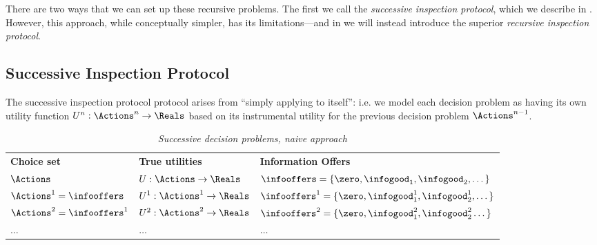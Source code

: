
There are two ways that we can set up these recursive problems. The first we call the \emph{successive inspection protocol}, which we describe in . However, this approach, while conceptually simpler, has its limitations---and in  we will instead introduce the superior \emph{recursive inspection protocol}.

\subsection{Successive Inspection Protocol}
\label{infonomy:app:naive}

The successive inspection protocol protocol arises from ``simply applying \citet{weissRedesigningInformationMarkets2024} to itself'': i.e. we model each decision problem as having its own utility function $U^n:\Actions^n\to\Reals$ based on its instrumental utility for the previous decision problem $\Actions^{n-1}$.


\begin{table}[h]
\centering
\caption{\emph{Successive decision problems, naive approach}}
\vspace{0.2em}
\label{infonomy:tab:sdp}
\begin{tabular}{lll}
\vspace{0.2em}
\textbf{Choice set} & \textbf{True utilities} & \textbf{Information Offers} \\

\vspace{0.2em}
$\Actions$ & $U:\Actions\to\Reals$ & $\infooffers=\{\zero,\infogood_1,\infogood_2,\dots\}$ \\

\vspace{0.2em}
$\Actions^1=\infooffers$ & $U^1:\Actions^1\to\Reals$ & $\infooffers^1=\{\zero,\infogood^1_1,\infogood^1_2,\dots\}$ \\

\vspace{0.2em}
$\Actions^2=\infooffers^1$ & $U^2:\Actions^2\to\Reals$ & $\infooffers^2=\{\zero,\infogood^2_1,\infogood^2_2\dots\}$ \\
$\dots$ & $\dots$ & $\dots$ \\
\end{tabular}
\end{table}

